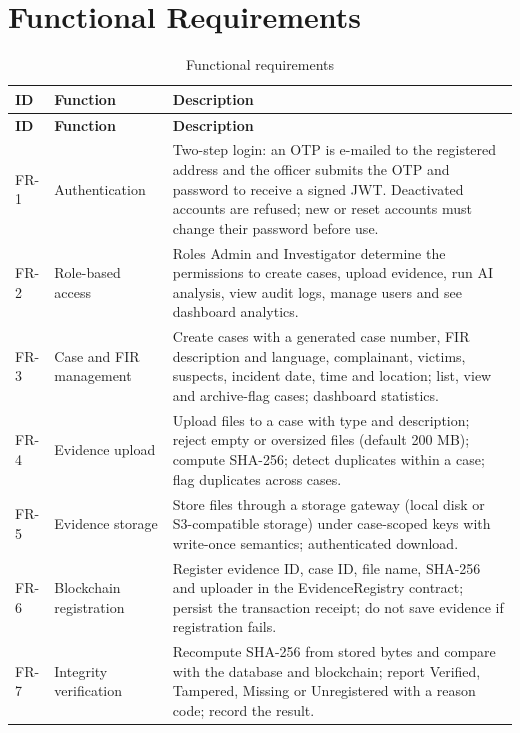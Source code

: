 \documentclass[12pt,a4paper,oneside]{report}
\begin{document}
\section{Functional Requirements}
{\footnotesize
\setlength{\tabcolsep}{3pt}
\renewcommand{\arraystretch}{1.15}
\begin{longtable}{|>{\raggedright\arraybackslash}p{1.33cm}|>{\raggedright\arraybackslash}p{3.03cm}|>{\raggedright\arraybackslash}p{9.85cm}|}
\caption{Functional requirements}\\
\hline
\rowcolor{headfill}\textbf{ID} & \textbf{Function} & \textbf{Description} \\ \hline
\endfirsthead
\hline
\rowcolor{headfill}\textbf{ID} & \textbf{Function} & \textbf{Description} \\ \hline
\endhead
\hline \endfoot
FR-1 & Authentication & Two-step login: an OTP is e-mailed to the registered address and the officer submits the OTP and password to receive a signed JWT. Deactivated accounts are refused; new or reset accounts must change their password before use. \\ \hline
FR-2 & Role-based access & Roles Admin and Investigator determine the permissions to create cases, upload evidence, run AI analysis, view audit logs, manage users and see dashboard analytics. \\ \hline
FR-3 & Case and FIR management & Create cases with a generated case number, FIR description and language, complainant, victims, suspects, incident date, time and location; list, view and archive-flag cases; dashboard statistics. \\ \hline
FR-4 & Evidence upload & Upload files to a case with type and description; reject empty or oversized files (default 200 MB); compute SHA-256; detect duplicates within a case; flag duplicates across cases. \\ \hline
FR-5 & Evidence storage & Store files through a storage gateway (local disk or S3-compatible storage) under case-scoped keys with write-once semantics; authenticated download. \\ \hline
FR-6 & Blockchain registration & Register evidence ID, case ID, file name, SHA-256 and uploader in the EvidenceRegistry contract; persist the transaction receipt; do not save evidence if registration fails. \\ \hline
FR-7 & Integrity verification & Recompute SHA-256 from stored bytes and compare with the database and blockchain; report Verified, Tampered, Missing or Unregistered with a reason code; record the result. \\ \hline

\end{longtable}}
\end{document}
